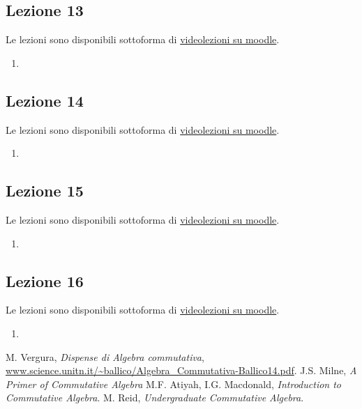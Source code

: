 \documentclass[italian]{article}
\begin{document}
    \subsection{Lezione 13}

	Le lezioni sono disponibili sottoforma di 
	\href{https://didatticaonline.unitn.it/dol/course/view.php?id=23268}{videolezioni
		su moodle}.
	
	\begin{enumerate}
		\item 
	\end{enumerate}   

	\subsection{Lezione 14}
	
	Le lezioni sono disponibili sottoforma di 
	\href{https://didatticaonline.unitn.it/dol/course/view.php?id=23268}{videolezioni
		su moodle}.
	
	\begin{enumerate}
		\item 
	\end{enumerate}  

	\subsection{Lezione 15}
	
	Le lezioni sono disponibili sottoforma di 
	\href{https://didatticaonline.unitn.it/dol/course/view.php?id=23268}{videolezioni
		su moodle}.
	
	\begin{enumerate}
		\item 
	\end{enumerate}  

	\subsection{Lezione 16}
	
	Le lezioni sono disponibili sottoforma di 
	\href{https://didatticaonline.unitn.it/dol/course/view.php?id=23268}{videolezioni
		su moodle}.
	
	\begin{enumerate}
		\item 
	\end{enumerate}  

    \begin{thebibliography}{9}
       M. Vergura, \textit{Dispense di Algebra commutativa},
        \url{www.science.unitn.it/~ballico/Algebra_Commutativa-Ballico14.pdf}.
       J.S. Milne, \textit{A Primer of Commutative Algebra}
       M.F. Atiyah, I.G. Macdonald, \textit{Introduction to 
            Commutative Algebra}.
       M. Reid, \textit{Undergraduate Commutative Algebra}.
    \end{thebibliography}
\end{document}
